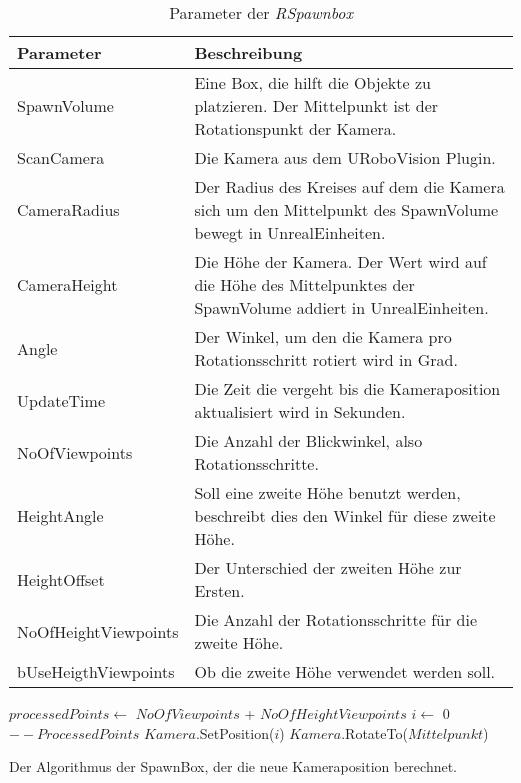 \begin{table}
\begin{tabularx}{\textwidth}{lX}
\textbf{Parameter}  & \textbf{Beschreibung} \\ \hline
SpawnVolume         & Eine Box, die hilft die Objekte zu platzieren. Der Mittelpunkt ist der Rotationspunkt der Kamera.\\  
ScanCamera          & Die Kamera aus dem URoboVision Plugin. \\ 
CameraRadius        & Der Radius des Kreises auf dem die Kamera sich um den Mittelpunkt des SpawnVolume bewegt in UnrealEinheiten.\\ 
CameraHeight        & Die Höhe der Kamera. Der Wert wird auf die Höhe des Mittelpunktes der SpawnVolume addiert in UnrealEinheiten.\\ 
Angle               & Der Winkel, um den die Kamera pro Rotationsschritt rotiert wird in Grad.\\ 
UpdateTime          & Die Zeit die vergeht bis die Kameraposition aktualisiert wird in Sekunden.\\ 
NoOfViewpoints      & Die Anzahl der Blickwinkel, also Rotationsschritte.\\ 
HeightAngle         & Soll eine zweite Höhe benutzt werden, beschreibt dies den Winkel für diese zweite Höhe.\\ 
HeightOffset        & Der Unterschied der zweiten Höhe zur Ersten.\\
NoOfHeightViewpoints & Die Anzahl der Rotationsschritte für die zweite Höhe.\\ 
bUseHeigthViewpoints & Ob die zweite Höhe verwendet werden soll. \\  \hline
\end{tabularx}
\caption{Parameter der \textit{RSpawnbox}}
\label{tab:spawnboxParams}
\end{table}

\begin{algorithm}[H]
\BlankLine
$processedPoints \gets$ $NoOfViewpoints$ + $NoOfHeightViewpoints$\;
$i \gets$ 0\;
$--ProcessedPoints$\;
$Kamera$.SetPosition($i$)\;
$Kamera$.RotateTo($Mittelpunkt$)\;
\caption[SpawnBox]{Der Algorithmus der SpawnBox, der die neue Kameraposition berechnet.}
\label{alg:SpawnBox}
\end{algorithm}


